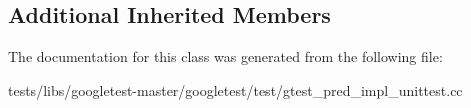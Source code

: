 \subsection*{Additional Inherited Members}


The documentation for this class was generated from the following file\+:\begin{DoxyCompactItemize}
\item 
tests/libs/googletest-\/master/googletest/test/gtest\+\_\+pred\+\_\+impl\+\_\+unittest.\+cc\end{DoxyCompactItemize}

